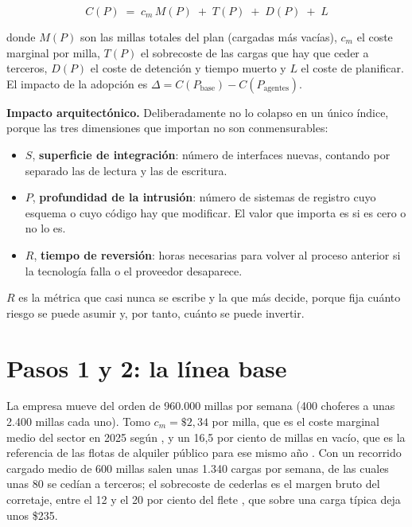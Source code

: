 \documentclass[11pt,letterpaper]{article}
\begin{document}
\begin{equation}
C(P) \;=\; c_{m}\, M(P) \;+\; T(P) \;+\; D(P) \;+\; L
\label{eq:fom}
\end{equation}

donde $M(P)$ son las millas totales del plan (cargadas más vacías), $c_{m}$ el
coste marginal por milla, $T(P)$ el sobrecoste de las cargas que hay que ceder
a terceros, $D(P)$ el coste de detención y tiempo muerto y $L$ el coste de
planificar. El impacto de la adopción es
$\Delta = C(P_{\text{base}}) - C(P_{\text{agentes}})$.

\textbf{Impacto arquitectónico.} Deliberadamente no lo colapso en un único
índice, porque las tres dimensiones que importan no son conmensurables:

\begin{itemize}
\item $S$, \textbf{superficie de integración}: número de interfaces nuevas,
  contando por separado las de lectura y las de escritura.
\item $P$, \textbf{profundidad de la intrusión}: número de sistemas de
  registro cuyo esquema o cuyo código hay que modificar. El valor que importa
  es si es cero o no lo es.
\item $R$, \textbf{tiempo de reversión}: horas necesarias para volver al
  proceso anterior si la tecnología falla o el proveedor desaparece.
\end{itemize}

$R$ es la métrica que casi nunca se escribe y la que más decide, porque fija
cuánto riesgo se puede asumir y, por tanto, cuánto se puede invertir.

\section{Pasos 1 y 2: la línea base}

La empresa mueve del orden de 960.000 millas por semana (400 choferes a unas
2.400 millas cada uno). Tomo $c_{m} = \$2{,}34$ por milla, que es el coste
marginal medio del sector en 2025 según \textcite{atri2026}, y un 16,5 por
ciento de millas en vacío, que es la referencia de las flotas de alquiler
público para ese mismo año \parencite{freightwaves2025vacio}. Con un recorrido
cargado medio de 600 millas salen unas 1.340 cargas por semana, de las cuales
unas 80 se cedían a terceros; el sobrecoste de cederlas es el margen bruto del
corretaje, entre el 12 y el 20 por ciento del flete
\parencite{ats2026corretaje}, que sobre una carga típica deja unos \$235.
\end{document}
